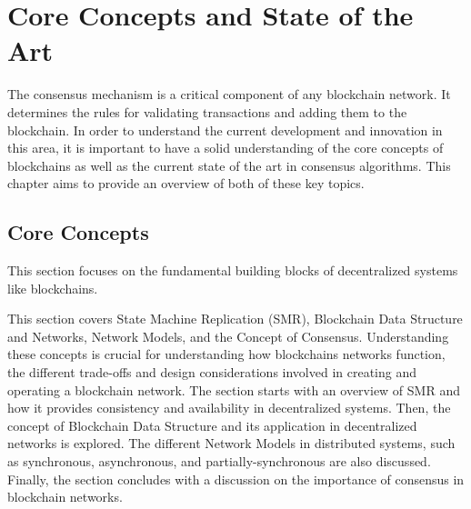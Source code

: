 \chapter{Core Concepts and State of the Art}

The consensus mechanism is a critical component of any blockchain network. It determines the rules for validating transactions and adding them to the blockchain. In order to understand the current development and innovation in this area, it is important to have a solid understanding of the core concepts of blockchains as well as the current state of the art in consensus algorithms. This chapter aims to provide an overview of both of these key topics.

\section{Core Concepts}
This section focuses on the fundamental building blocks of decentralized systems like block\-chains.

This section covers State Machine Replication (SMR), Blockchain Data Structure and Networks, Network Models, and the Concept of Consensus.
Understanding these concepts is crucial for understanding how blockchains networks function, the different trade-offs and design considerations involved in creating and operating a blockchain network. The section starts with an overview of SMR and how it provides consistency and availability in decentralized systems.
Then, the concept of Blockchain Data Structure and its application in decentralized networks is explored. The different Network Models in distributed systems, such as synchronous, asynchronous, and partially-synchronous are also discussed. Finally, the section concludes with a discussion on the importance of consensus in blockchain networks.


